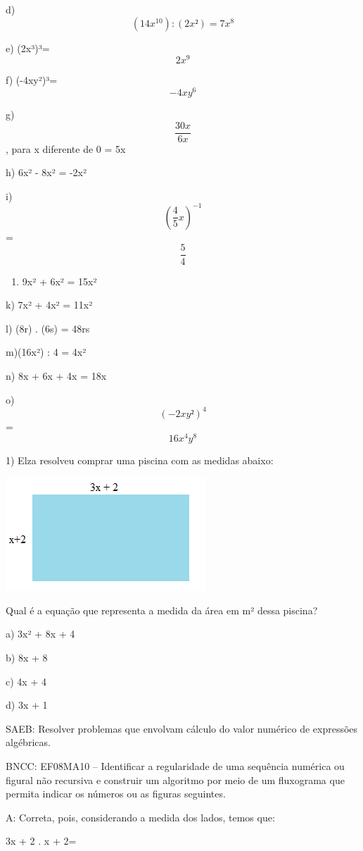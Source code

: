 d) \[(14x^10) : (2x²)=7x^8\]

e) (2x³)³= \[2x^9\]

f) (-4xy²)³= \[-4xy^6\]

g) \[\frac{30x}{6x}\], para x diferente de 0 = 5x

h) 6x² - 8x² = -2x²

i)\[(\frac{4}{5}x)^{-1}\] = \[\frac{5}{4}\]

\begin{enumerate}
\def\labelenumi{\alph{enumi})}
\setcounter{enumi}{9}
\tightlist
\item
  9x² + 6x² = 15x²
\end{enumerate}

k) 7x² + 4x² = 11x²

l) (8r) . (6s) = 48rs

m)(16x²) : 4 = 4x²

n) 8x + 6x + 4x = 18x

o) \[(-2xy²)^4\]= \[16x^4 y^8\]


1) Elza resolveu comprar uma piscina com as medidas abaixo:

\includegraphics[width=2.9625in,height=1.67014in]{./imgSAEB_8_MAT/media/image6.png}

Qual é a equação que representa a medida da área em m² dessa piscina?

a) 3x² + 8x + 4

b) 8x + 8

c) 4x + 4

d) 3x + 1

SAEB: Resolver problemas que envolvam cálculo do valor numérico de
expressões algébricas.

BNCC: EF08MA10 -- Identificar a regularidade de uma sequência numérica
ou figural não recursiva e construir um algoritmo por meio de um
fluxograma que permita indicar os números ou as figuras seguintes.

A: Correta, pois, considerando a medida dos lados, temos que:

3x + 2 . x + 2=

